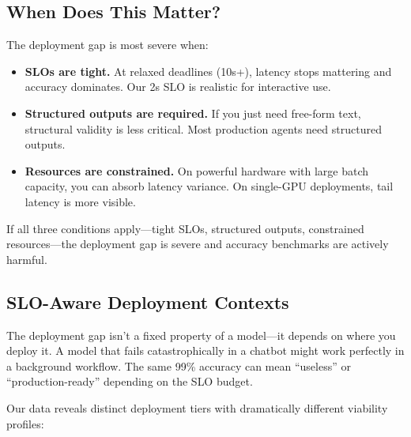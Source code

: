 \documentclass[11pt]{article}
\begin{document}
\subsection{When Does This Matter?}

The deployment gap is most severe when:
\begin{itemize}[leftmargin=12pt]
    \item \textbf{SLOs are tight.} At relaxed deadlines (10s+), latency stops mattering and accuracy dominates. Our 2s SLO is realistic for interactive use.
    \item \textbf{Structured outputs are required.} If you just need free-form text, structural validity is less critical. Most production agents need structured outputs.
    \item \textbf{Resources are constrained.} On powerful hardware with large batch capacity, you can absorb latency variance. On single-GPU deployments, tail latency is more visible.
\end{itemize}

If all three conditions apply---tight SLOs, structured outputs, constrained resources---the deployment gap is severe and accuracy benchmarks are actively harmful.

\subsection{SLO-Aware Deployment Contexts}
\label{sec:slo-contexts}


The deployment gap isn't a fixed property of a model---it depends on where you deploy it.
A model that fails catastrophically in a chatbot might work perfectly in a background workflow.
The same 99\% accuracy can mean ``useless'' or ``production-ready'' depending on the SLO budget.

Our data reveals distinct deployment tiers with dramatically different viability profiles:
\end{document}
